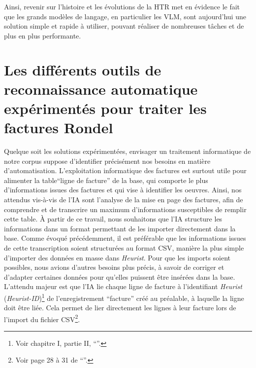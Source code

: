 Ainsi, revenir sur l'histoire et les évolutions de la HTR met en évidence le fait que les grands modèles de langage, en particulier les VLM, sont aujourd'hui une solution simple et rapide à utiliser, pouvant réaliser de nombreuses tâches et de plus en plus performante. 


\section{Les différents outils de reconnaissance automatique expérimentés pour traiter les factures Rondel} 

Quelque soit les solutions expérimentées, envisager un traitement informatique de notre corpus suppose d'identifier précisément nos besoins en matière d'automatisation. L'exploitation informatique des factures est surtout utile pour alimenter la table\enquote{ligne de facture} de la base, qui comporte le plus d'informations issues des factures et qui vise à identifier les oeuvres. Ainsi, nos attendus vis-à-vis de l'IA sont l'analyse de la mise en page des factures, afin de comprendre et de transcrire un maximum d'informations susceptibles de remplir cette table. À partir de ce travail, nous souhaitons que l'IA structure les informations dans un format permettant de les importer directement dans la base. Comme évoqué précédemment, il est préférable que les informations issues de cette transcription soient structurées au format CSV, manière la plus simple d'importer des données en masse dans \emph{Heurist}. Pour que les imports soient possibles, nous avions d'autres besoins plus précis, à savoir de corriger et d'adapter certaines données pour qu'elles puissent être insérées dans la base. L'attendu majeur est que l'IA lie chaque ligne de facture à l'identifiant \emph{Heurist}
(\emph{Heurist-ID})\footnote{Voir chapitre I, partie II, \enquote{}.} de l'enregistrement \enquote{facture} créé au préalable, à laquelle la ligne doit être liée. Cela permet de lier directement les lignes à leur facture lors de l'import du fichier CSV\footnote{Voir page 28 à 31 de \enquote{}.}.


